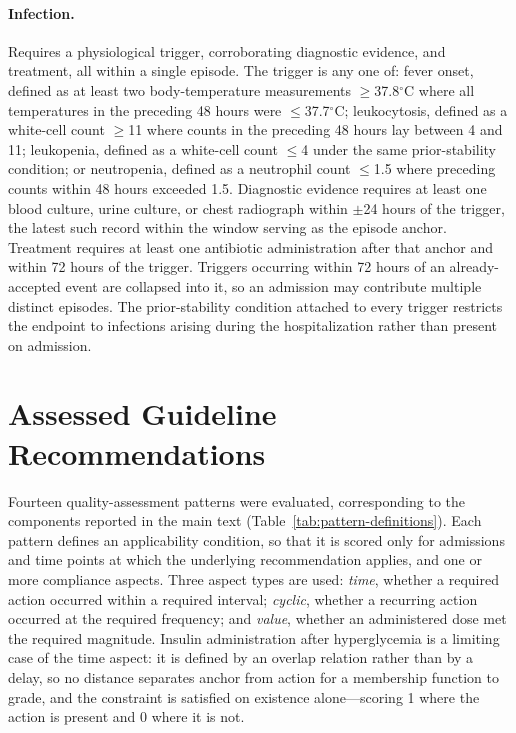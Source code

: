 \documentclass[11pt,a4paper]{article}
\begin{document}
\paragraph{Infection.}
Requires a physiological trigger, corroborating diagnostic evidence, and
treatment, all within a single episode. The trigger is any one of: fever
onset, defined as at least two body-temperature measurements
$\geq$37.8$^\circ$C where all temperatures in the preceding 48 hours were
$\leq$37.7$^\circ$C; leukocytosis, defined as a white-cell count $\geq$11
where counts in the preceding 48 hours lay between 4 and 11; leukopenia,
defined as a white-cell count $\leq$4 under the same prior-stability
condition; or neutropenia, defined as a neutrophil count $\leq$1.5 where
preceding counts within 48 hours exceeded 1.5. Diagnostic evidence requires
at least one blood culture, urine culture, or chest radiograph within
$\pm$24 hours of the trigger, the latest such record within the window
serving as the episode anchor. Treatment requires at least one antibiotic
administration after that anchor and within 72 hours of the trigger. Triggers
occurring within 72 hours of an already-accepted event are collapsed into it,
so an admission may contribute multiple distinct episodes. The
prior-stability condition attached to every trigger restricts the endpoint to
infections arising during the hospitalization rather than present on
admission.

\section{Assessed Guideline Recommendations}
\label{app:patterns}

Fourteen quality-assessment patterns were evaluated, corresponding to the
components reported in the main text (Table~\ref{tab:pattern-definitions}).
Each pattern defines an applicability condition, so that it is scored only
for admissions and time points at which the underlying recommendation
applies, and one or more compliance aspects. Three aspect types are used:
\emph{time}, whether a required action occurred within a required interval;
\emph{cyclic}, whether a recurring action occurred at the required frequency;
and \emph{value}, whether an administered dose met the required magnitude.
Insulin administration after hyperglycemia is a limiting case of the time
aspect: it is defined by an overlap relation rather than by a delay, so no
distance separates anchor from action for a membership function to grade, and
the constraint is satisfied on existence alone---scoring 1 where the action is
present and 0 where it is not.
\end{document}
